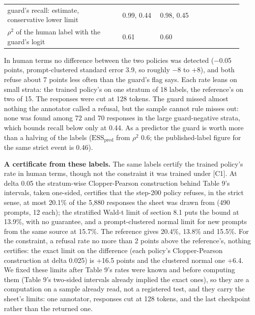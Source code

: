 \documentclass[11pt]{article}
\begin{document}
\begin{longtable}{@{}>{\raggedright\arraybackslash}p{0.461\linewidth}>{\raggedright\arraybackslash}p{0.150\linewidth}>{\raggedright\arraybackslash}p{0.336\linewidth}@{}}
\hspace{0pt}guard's recall: estimate, conservative lower limit & \hspace{0pt}0.99, 0.44 & \hspace{0pt}0.98, 0.45 \\
\hspace{0pt}$\rho ^{2}$ of the human label with the guard's logit & \hspace{0pt}0.61 & \hspace{0pt}0.60 \\
\end{longtable}
\endgroup

In human terms no difference between the two policies was detected ($-$0.05 points, prompt-clustered standard error 3.9, so roughly $-$8 to +8), and both refuse about 7 points less often than the guard's flag says. Each rate leans on small strata: the trained policy's on one stratum of 18 labels, the reference's on two of 15. The responses were cut at 128 tokens. The guard missed almost nothing the annotator called a refusal, but the sample cannot rule misses out: none was found among 72 and 70 responses in the large guard-negative strata, which bounds recall below only at 0.44. As a predictor the guard is worth more than a halving of the labels ($\mathrm{ESS}_{\mathrm{pred}}$ from $\rho ^{2}$ 0.6; the published-label figure for the same strict event is 0.46).


\textbf{A certificate from these labels.} The same labels certify the trained policy's rate in human terms, though not the constraint it was trained under [C1]. At delta 0.05 the stratum-wise Clopper-Pearson construction behind Table 9's intervals, taken one-sided, certifies that the step-200 policy refuses, in the strict sense, at most 20.1\% of the 5,880 responses the sheet was drawn from (490 prompts, 12 each); the stratified Wald-t limit of section 8.1 puts the bound at 13.9\%, with no guarantee, and a prompt-clustered normal limit for new prompts from the same source at 15.7\%. The reference gives 20.4\%, 13.8\% and 15.5\%. For the constraint, a refusal rate no more than 2 points above the reference's, nothing certifies: the exact limit on the difference (each policy's Clopper-Pearson construction at delta 0.025) is +16.5 points and the clustered normal one +6.4. We fixed these limits after Table 9's rates were known and before computing them (Table 9's two-sided intervals already implied the exact ones), so they are a computation on a sample already read, not a registered test, and they carry the sheet's limits: one annotator, responses cut at 128 tokens, and the last checkpoint rather than the returned one.
\end{document}
